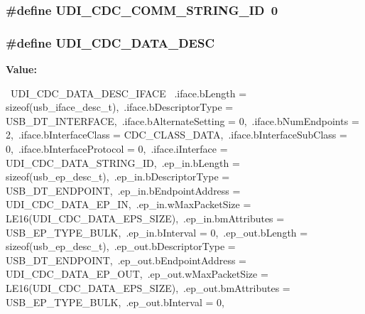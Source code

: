\hypertarget{group__udi__cdc__group_ga4fef11b2181a17d8faac207f30c8a088}{
\subsubsection[{\-U\-D\-I\-\_\-\-C\-D\-C\-\_\-\-C\-O\-M\-M\-\_\-\-S\-T\-R\-I\-N\-G\-\_\-\-I\-D}]{\setlength{\rightskip}{0pt plus 5cm}\#define \-U\-D\-I\-\_\-\-C\-D\-C\-\_\-\-C\-O\-M\-M\-\_\-\-S\-T\-R\-I\-N\-G\-\_\-\-I\-D~0}}
\label{group__udi__cdc__group_ga4fef11b2181a17d8faac207f30c8a088}
\hypertarget{group__udi__cdc__group_gade744816217f972675f9e7e5c2204d93}{
\subsubsection[{\-U\-D\-I\-\_\-\-C\-D\-C\-\_\-\-D\-A\-T\-A\-\_\-\-D\-E\-S\-C}]{\setlength{\rightskip}{0pt plus 5cm}\#define \-U\-D\-I\-\_\-\-C\-D\-C\-\_\-\-D\-A\-T\-A\-\_\-\-D\-E\-S\-C}}
\label{group__udi__cdc__group_gade744816217f972675f9e7e5c2204d93}
{\bfseries \-Value\-:}
\begin{DoxyCode}
{\
   UDI_CDC_DATA_DESC_IFACE \
   .iface.bLength                = sizeof(usb_iface_desc_t),\
   .iface.bDescriptorType        = USB_DT_INTERFACE,\
   .iface.bAlternateSetting      = 0,\
   .iface.bNumEndpoints          = 2,\
   .iface.bInterfaceClass        = CDC_CLASS_DATA,\
   .iface.bInterfaceSubClass     = 0,\
   .iface.bInterfaceProtocol     = 0,\
   .iface.iInterface             = UDI_CDC_DATA_STRING_ID,\
   .ep_in.bLength                = sizeof(usb_ep_desc_t),\
   .ep_in.bDescriptorType        = USB_DT_ENDPOINT,\
   .ep_in.bEndpointAddress       = UDI_CDC_DATA_EP_IN,\
   .ep_in.wMaxPacketSize         = LE16(UDI_CDC_DATA_EPS_SIZE),\
   .ep_in.bmAttributes           = USB_EP_TYPE_BULK,\
   .ep_in.bInterval              = 0,\
   .ep_out.bLength               = sizeof(usb_ep_desc_t),\
   .ep_out.bDescriptorType       = USB_DT_ENDPOINT,\
   .ep_out.bEndpointAddress      = UDI_CDC_DATA_EP_OUT,\
   .ep_out.wMaxPacketSize        = LE16(UDI_CDC_DATA_EPS_SIZE),\
   .ep_out.bmAttributes          = USB_EP_TYPE_BULK,\
   .ep_out.bInterval             = 0,\
   }
\end{DoxyCode}


